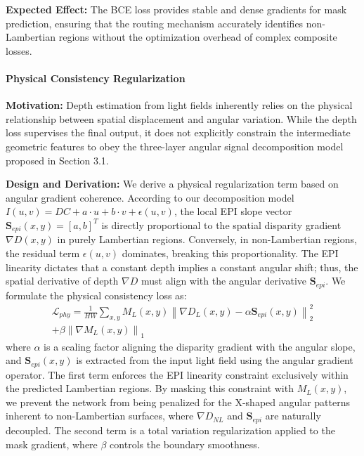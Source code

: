 \documentclass[lettersize,journal]{IEEEtran}
\begin{document}
\textbf{Expected Effect:} The BCE loss provides stable and dense gradients for mask prediction, ensuring that the routing mechanism accurately identifies non-Lambertian regions without the optimization overhead of complex composite losses.

\paragraph{Physical Consistency Regularization}
\textbf{Motivation:} Depth estimation from light fields inherently relies on the physical relationship between spatial displacement and angular variation. While the depth loss supervises the final output, it does not explicitly constrain the intermediate geometric features to obey the three-layer angular signal decomposition model proposed in Section 3.1.

\textbf{Design and Derivation:} We derive a physical regularization term based on angular gradient coherence. According to our decomposition model $I(u,v) = DC + a \cdot u + b \cdot v + \epsilon(u,v)$, the local EPI slope vector $\mathbf{S}_{epi}(x,y) = [a, b]^T$ is directly proportional to the spatial disparity gradient $\nabla D(x,y)$ in purely Lambertian regions. Conversely, in non-Lambertian regions, the residual term $\epsilon(u,v)$ dominates, breaking this proportionality. The EPI linearity dictates that a constant depth implies a constant angular shift; thus, the spatial derivative of depth $\nabla D$ must align with the angular derivative $\mathbf{S}_{epi}$. We formulate the physical consistency loss as:
\begin{multline}
\mathcal{L}_{phy} = \frac{1}{HW} \sum_{x,y} M_{L}(x,y) \left\| \nabla D_{L}(x,y) - \alpha \mathbf{S}_{epi}(x,y) \right\|_2^2 \\
+ \beta \left\| \nabla M_{L}(x,y) \right\|_1
\label{eq:ch3_26}
\end{multline}
where $\alpha$ is a scaling factor aligning the disparity gradient with the angular slope, and $\mathbf{S}_{epi}(x,y)$ is extracted from the input light field using the angular gradient operator. The first term enforces the EPI linearity constraint exclusively within the predicted Lambertian regions. By masking this constraint with $M_{L}(x,y)$, we prevent the network from being penalized for the X-shaped angular patterns inherent to non-Lambertian surfaces, where $\nabla D_{NL}$ and $\mathbf{S}_{epi}$ are naturally decoupled. The second term is a total variation regularization applied to the mask gradient, where $\beta$ controls the boundary smoothness.
\end{document}
